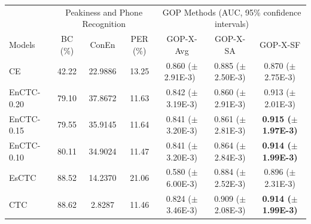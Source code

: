 \begin{tabular}{ l|ccc|ccc }
 \hline\hline
  & \multicolumn{3}{c|}{Peakiness and Phone Recognition} & \multicolumn{3}{c}{GOP Methods (AUC, 95\% confidence intervals)} \\
 Models & BC (\%) & ConEn & PER (\%) & GOP-X-Avg & GOP-X-SA & GOP-X-SF \\
 \hline
CE         & 42.22 & 22.9886 & 13.25 & 0.860 ($\pm$2.91E-3)~\cite{cao24b_interspeech} & 0.885 ($\pm$2.50E-3) & 0.870 ($\pm$2.75E-3) \\
EnCTC-0.20 & 79.10 & 37.8672 & 11.63 & 0.842 ($\pm$3.19E-3) & 0.860 ($\pm$2.91E-3) & 0.913 ($\pm$2.01E-3) \\
EnCTC-0.15 & 79.55 & 35.9145 & 11.64 & 0.841 ($\pm$3.20E-3) & 0.861 ($\pm$2.81E-3) & \textbf{0.915 ($\pm$1.97E-3)} \\
EnCTC-0.10 & 80.11 & 34.9024 & 11.47 & 0.841 ($\pm$3.20E-3) & 0.864 ($\pm$2.84E-3) &  \textbf{0.914 ($\pm$1.99E-3)} \\
EsCTC      & 88.52 & 14.2370 & 21.06 & 0.580 ($\pm$6.00E-3) & 0.884 ($\pm$2.52E-3) & 0.896 ($\pm$2.31E-3) \\
CTC        & 88.62 & 2.8287  & 11.46 & 0.824 ($\pm$3.46E-3) & 0.909 ($\pm$2.08E-3) &  \textbf{0.914 ($\pm$1.99E-3)} \\
 \hline\hline
\end{tabular}
